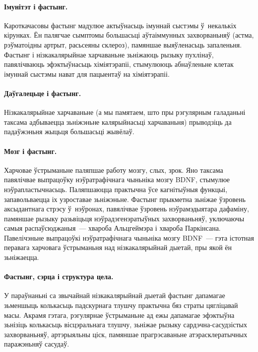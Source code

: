 \paragraph{Імунітэт і фастынг.}
Кароткачасовы фастынг мадулюе актыўнасьць імуннай сыстэмы ў~некалькіх кірунках. Ён палягчае сымптомы большасьці аўтаіммунных захворваньняў (астма, рэўматоідны артрыт, расьсеяны склероз), памяншае выяўленасьць запаленьня. Фастынг і нізкакалярыйнае харчаваньне зьніжаюць рызыку пухлінаў, павялічваюць эфэктыўнасьць хіміятэрапіі, стымулююць абнаўленьне клетак імуннай сыстэмы нават для пацыентаў на хіміятэрапіі.

\paragraph{Даўгалецьце і фастынг.}
Нізкакалярыйнае харчаваньне (а мы памятаем, што пры рэгулярным галаданьні таксама адбываецца зьніжэньне калярыйнасьці харчаваньня) прыводзіць да падаўжэньня жыцьця большасьці жывёлаў.

\paragraph{Мозг і фастынг.}
Харчовае ўстрыманьне паляпшае работу мозгу, слых, зрок. Яно таксама павялічвае выпрацоўку нэўратрафічнага чыньніка мозгу BDNF, стымулюе нэўрапластычнасьць. Паляпшаюцца практычна ўсе кагнітыўныя функцыі, запавольваецца іх узроставае зьніжэньне. Фастынг прыкметна зьніжае ўзровень аксыдантнага стрэсу ў~нэўронах, павялічвае ўзровень нэўрамэдыятара дафаміну, памяншае рызыку разьвіцьця нэўрадэгенэратыўных захворваньняў, уключаючы самыя распаўсюджаныя~--- хвароба Альцгеймэра і хвароба Паркінсана. Павелічэньне выпрацоўкі нэўратрафічнага чыньніка мозгу BDNF~--- гэта істотная перавага харчовага ўстрыманьня над нізкакалярыйнай дыетай, пры якой ён зьніжаецца.


\paragraph{Фастынг, сэрца і структура цела.}
У параўнаньні са звычайнай нізкакалярыйнай дыетай фастынг дапамагае зьменшыць колькасьць падскурнага тлушчу практычна бяз страты цягліцавай масы. Акрамя гэтага, рэгулярнае ўстрыманьне ад ежы дапамагае эфэктыўна зьнізіць колькасьць вісцэральнага тлушчу, зьніжае рызыку сардэчна-сасудзістых захворваньняў, артэрыяльны ціск, памяншае прагрэсаваньне атэрасклератычных паражэньняў сасудаў.

